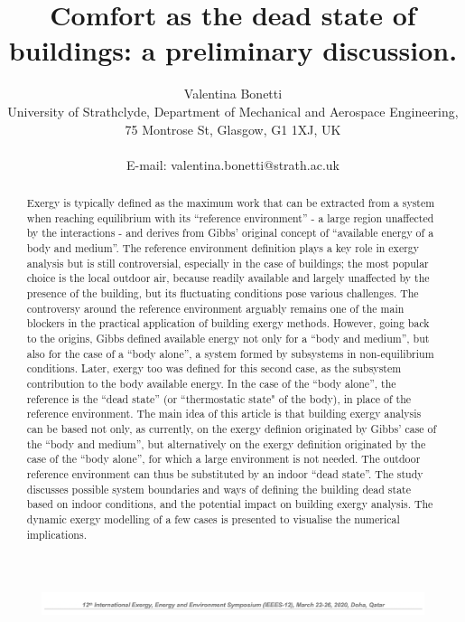 \documentclass[10pt]{extarticle} %
\title{Comfort as the dead state of buildings: a preliminary discussion.}
\author{Valentina Bonetti\\ University of Strathclyde, Department of Mechanical and Aerospace Engineering, 75 Montrose St, Glasgow, G1 1XJ,  UK\\ \\ E-mail: valentina.bonetti@strath.ac.uk}
\date{}
\begin{document}
\renewcommand{\abstractname}{Abstract:}



\begin{figure}[!h]
\centering
\includegraphics[width=6.8in, center]{images/articleHeading1.png}
\end{figure}

\let\newpage\relax
\vspace*{-2cm}
\maketitle
\vspace*{-1cm}


\begin{abstract}

\noindent Exergy is typically defined as the maximum work that can be extracted from a system when reaching equilibrium with its ``reference environment'' - a large region unaffected by the interactions - and derives from Gibbs' original concept of ``available energy of a body and medium''. The reference environment definition  plays a key role in exergy analysis but is still controversial, especially in the case of buildings; the most popular choice is the local outdoor air, because readily available and largely unaffected by the presence of the building, but its fluctuating conditions pose various challenges. The controversy around the reference environment arguably remains one of the main blockers in the practical application of building exergy methods.
However, going back to the origins, Gibbs defined available energy not only for a ``body and medium'', but also for the case of a ``body alone'', a system formed by subsystems in non-equilibrium conditions. Later, exergy too was defined for this second case, as the subsystem contribution to the body available energy. In the case of the ``body alone'', the reference is the ``dead state'' (or ``thermostatic state" of the body), in place of the reference environment. 
The main idea of this article is that building exergy analysis can be based not only, as currently, on the exergy definion originated by Gibbs' case of the ``body and medium'', but alternatively on the exergy definition originated by the case of the  ``body alone'', for which a large environment is not needed.  The outdoor reference environment can thus be substituted by an indoor ``dead state''. 
The study discusses possible system boundaries and ways of defining the building dead state based on indoor conditions, and the potential impact on building exergy analysis. The dynamic exergy modelling of a few cases is presented to visualise the numerical implications.

\end{abstract}
\end{document}
